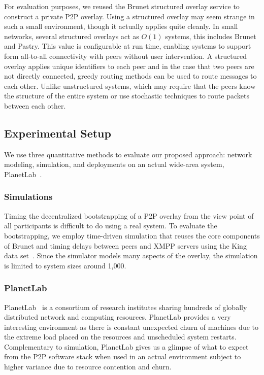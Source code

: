 \documentclass[conference]{IEEEtran}
\begin{document}
For evaluation purposes, we reused the Brunet structured overlay service to
construct a private P2P overlay.  Using a structured overlay may seem strange
in such a small environment, though it actually applies quite cleanly.  In
small networks, several structured overlays act as $O(1)$ systems, this
includes Brunet and Pastry.  This value is configurable at run time, enabling
systems to support form all-to-all connectivity with peers without user
intervention.  A structured overlay applies unique identifiers to each peer and
in the case that two peers are not directly connected, greedy routing methods
can be used to route messages to each other.  Unlike unstructured systems,
which may require that the peers know the structure of the entire system or use
stochastic techniques to route packets between each other.

\subsection{Experimental Setup}

We use three quantitative methods to evaluate our proposed approach: network
modeling, simulation, and deployments on an actual wide-area system,
PlanetLab~\cite{planetlab}.

\subsubsection{Simulations}

Timing the decentralized bootstrapping of a P2P overlay from the view point of
all participants is difficult to do using a real system.  To evaluate the
bootstrapping, we employ time-driven simulation that reuses the core components
of Brunet and timing delays between peers and XMPP servers using the King data
set~\cite{king_data}.  Since the simulator models many aspects of the overlay,
the simulation is limited to system sizes around 1,000.

\subsubsection{PlanetLab}

PlanetLab~\cite{planetlab} is a consortium of research institutes sharing
hundreds of globally distributed network and computing resources.  PlanetLab
provides a very interesting environment as there is constant unexpected churn
of machines due to the extreme load placed on the resources and unscheduled
system restarts.  Complementary to simulation, PlanetLab gives us a glimpse of
what to expect from the P2P software stack when used in an actual environment
subject to higher variance due to resource contention and churn.
\end{document}
